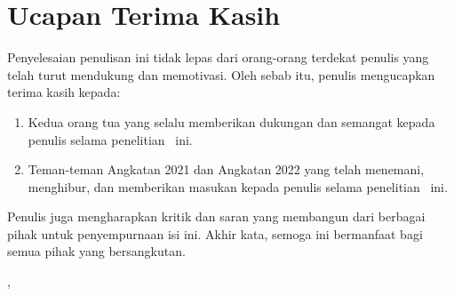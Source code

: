 \chapter*{Ucapan Terima Kasih}

Penyelesaian penulisan \MakeTextLowercase{\documentNameBahasa} ini tidak lepas dari orang-orang terdekat penulis yang telah turut mendukung dan memotivasi. Oleh sebab itu, penulis mengucapkan terima kasih kepada:

\begin{enumerate}
	\item Kedua orang tua yang selalu memberikan dukungan dan semangat kepada penulis selama penelitian \documentNameBahasa\ ini.

	\item Teman-teman Angkatan 2021 dan Angkatan 2022 yang telah menemani, menghibur, dan memberikan masukan kepada penulis selama penelitian \documentNameBahasa\ ini.
\end{enumerate}

Penulis juga mengharapkan kritik dan saran yang membangun dari berbagai pihak untuk penyempurnaan isi \MakeTextLowercase{\documentNameBahasa} ini. Akhir kata, semoga \MakeTextLowercase{\documentNameBahasa} ini bermanfaat bagi semua pihak yang bersangkutan.

\vspace{2em}

\begin{flushright}
	\theCity, \theMonth\ \theYear

	\vspace{4em}

	\theAuthor
\end{flushright}
